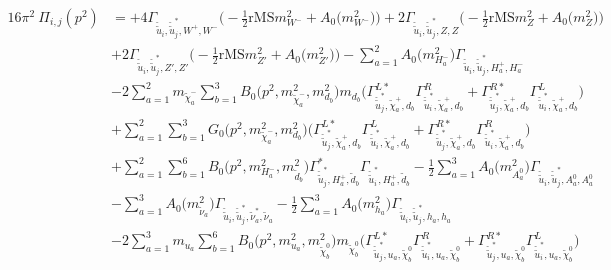 \begin{itemize}
\begin{align} 
16\pi^2 \ \Pi_{i,j}(p^2) &= +4 {\Gamma_{\check{\tilde{u}}_{{i}},\check{\tilde{u}}^*_{{j}},W^+,W^-}} \Big(-\frac{1}{2} \text{rMS} m^2_{W^-}  + {A_0\Big(m^2_{W^-}\Big)}\Big)+2 {\Gamma_{\check{\tilde{u}}_{{i}},\check{\tilde{u}}^*_{{j}},Z,Z}} \Big(-\frac{1}{2} \text{rMS} m^2_{Z}  + {A_0\Big(m^2_{Z}\Big)}\Big)\nonumber \\ 
 &+2 {\Gamma_{\check{\tilde{u}}_{{i}},\check{\tilde{u}}^*_{{j}},{Z'},{Z'}}} \Big(-\frac{1}{2} \text{rMS} m^2_{{Z'}}  + {A_0\Big(m^2_{{Z'}}\Big)}\Big)- \sum_{a=1}^{2}{A_0\Big(m^2_{H^-_{{a}}}\Big)} {\Gamma_{\check{\tilde{u}}_{{i}},\check{\tilde{u}}^*_{{j}},H^+_{{a}},H^-_{{a}}}}  \nonumber \\ 
 &-2 \sum_{a=1}^{2}m_{\tilde{\chi}^-_{{a}}} \sum_{b=1}^{3}{B_0\Big(p^{2},m^2_{\tilde{\chi}^-_{{a}}},m^2_{d_{{b}}}\Big)} m_{d_{{b}}} \Big({\Gamma^{L*}_{\check{\tilde{u}}^*_{{j}},\tilde{\chi}^+_{{a}},d_{{b}}}} {\Gamma^R_{\check{\tilde{u}}^*_{{i}},\tilde{\chi}^+_{{a}},d_{{b}}}}  + {\Gamma^{R*}_{\check{\tilde{u}}^*_{{j}},\tilde{\chi}^+_{{a}},d_{{b}}}} {\Gamma^L_{\check{\tilde{u}}^*_{{i}},\tilde{\chi}^+_{{a}},d_{{b}}}} \Big)  \nonumber \\ 
 &+\sum_{a=1}^{2}\sum_{b=1}^{3}{G_0\Big(p^{2},m^2_{\tilde{\chi}^-_{{a}}},m^2_{d_{{b}}}\Big)} \Big({\Gamma^{L*}_{\check{\tilde{u}}^*_{{j}},\tilde{\chi}^+_{{a}},d_{{b}}}} {\Gamma^L_{\check{\tilde{u}}^*_{{i}},\tilde{\chi}^+_{{a}},d_{{b}}}}  + {\Gamma^{R*}_{\check{\tilde{u}}^*_{{j}},\tilde{\chi}^+_{{a}},d_{{b}}}} {\Gamma^R_{\check{\tilde{u}}^*_{{i}},\tilde{\chi}^+_{{a}},d_{{b}}}} \Big)\nonumber \\ 
 &+\sum_{a=1}^{2}\sum_{b=1}^{6}{B_0\Big(p^{2},m^2_{H^-_{{a}}},m^2_{\tilde{d}_{{b}}}\Big)} {\Gamma^*_{\check{\tilde{u}}^*_{{j}},H^+_{{a}},\tilde{d}_{{b}}}} {\Gamma_{\check{\tilde{u}}^*_{{i}},H^+_{{a}},\tilde{d}_{{b}}}} -\frac{1}{2} \sum_{a=1}^{3}{A_0\Big(m^2_{A^0_{{a}}}\Big)} {\Gamma_{\check{\tilde{u}}_{{i}},\check{\tilde{u}}^*_{{j}},A^0_{{a}},A^0_{{a}}}}  \nonumber \\ 
 &- \sum_{a=1}^{3}{A_0\Big(m^2_{\tilde{\nu}_{{a}}}\Big)} {\Gamma_{\check{\tilde{u}}_{{i}},\check{\tilde{u}}^*_{{j}},\tilde{\nu}^*_{{a}},\tilde{\nu}_{{a}}}}  -\frac{1}{2} \sum_{a=1}^{3}{A_0\Big(m^2_{h_{{a}}}\Big)} {\Gamma_{\check{\tilde{u}}_{{i}},\check{\tilde{u}}^*_{{j}},h_{{a}},h_{{a}}}}  \nonumber \\ 
 &-2 \sum_{a=1}^{3}m_{u_{{a}}} \sum_{b=1}^{6}{B_0\Big(p^{2},m^2_{u_{{a}}},m^2_{\tilde{\chi}^0_{{b}}}\Big)} m_{\tilde{\chi}^0_{{b}}} \Big({\Gamma^{L*}_{\check{\tilde{u}}^*_{{j}},u_{{a}},\tilde{\chi}^0_{{b}}}} {\Gamma^R_{\check{\tilde{u}}^*_{{i}},u_{{a}},\tilde{\chi}^0_{{b}}}}  + {\Gamma^{R*}_{\check{\tilde{u}}^*_{{j}},u_{{a}},\tilde{\chi}^0_{{b}}}} {\Gamma^L_{\check{\tilde{u}}^*_{{i}},u_{{a}},\tilde{\chi}^0_{{b}}}} \Big)  \nonumber \\ 

\end{align}
\end{itemize}
